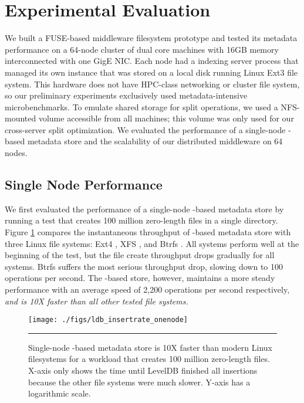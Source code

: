 \section{Experimental Evaluation}

We built a FUSE-based middleware filesystem prototype and tested its metadata
performance on a
64-node cluster of dual core machines with 16GB memory interconnected with one
GigE NIC.
Each node had a \giga{} indexing server process that managed its own \ldb instance
that was stored on a local disk running Linux Ext3 file system.
This hardware does not have HPC-class networking or cluster file system, so our
preliminary experiments exclusively used metadata-intensive microbenchmarks.
To emulate shared storage for split operations, we used a NFS-mounted
volume accessible from all machines; this volume was only used for
our cross-server \ldb split optimization.
We evaluated the performance of a single-node \ldb-based metadata store and
the scalability of our distributed middleware on 64 nodes.

\subsection{Single Node Performance}
We first evaluated the performance of a single-node \ldb-based metadata store
by running a test that creates 100 million zero-length files in a single
directory.
Figure \ref{graph:ldb-singlenode} compares the instantaneous throughput of \ldb-based metadata 
store with three Linux file systems: Ext4 \cite{Ext4}, XFS \cite{XFS}, and
Btrfs \cite{BTRFS}.
All systems perform well at the beginning of the test, but the file create
throughput drops gradually for all systems.
Btrfs suffers the most serious throughput drop, slowing down to 100 operations
per second.
The \ldb-based store, however, maintains a more steady performance
with an average speed of 2,200 operations per second respectively,
\textit{and is 10X faster than all other tested file systems.}

\begin{figure}[t]  %
\centerline{\texttt{[image: ./figs/ldb\_insertrate\_onenode]}}
\caption{\normalsize
Single-node \ldb{}-based metadata store is 10X faster than modern Linux
filesystems for a workload that creates 100 million zero-length files.
X-axis only shows the time until LevelDB finished all insertions because the other
file systems were much slower. Y-axis has a logarithmic scale.
}
\vspace{10pt}
\hrule
\label{graph:ldb-singlenode}
\end{figure}       %

